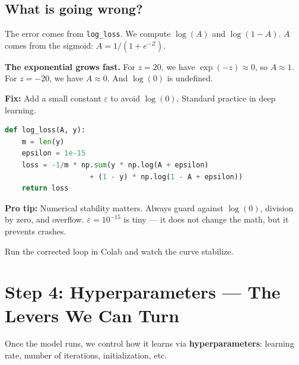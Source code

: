\documentclass[11pt]{article}
\begin{document}
\vspace{0.5em}

\subsection*{What is going wrong?}

The error comes from \texttt{log\_loss}.  
We compute $\log(A)$ and $\log(1-A)$.  
$A$ comes from the sigmoid: $A = 1/(1+e^{-Z})$.

\begin{tcolorbox}[colback=white!98!gray, colframe=gray!30!black, arc=1mm]
\textbf{The exponential grows fast.}  
For $z = 20$, we have $\exp(-z) \approx 0$, so $A \approx 1$.  
For $z = -20$, we have $A \approx 0$.  
And $\log(0)$ is undefined.
\end{tcolorbox}

\vspace{0.5em}

\noindent\textbf{Fix:} Add a small constant $\varepsilon$ to avoid $\log(0)$.  
Standard practice in deep learning.

\begin{lstlisting}[language=Python]
def log_loss(A, y):
    m = len(y)
    epsilon = 1e-15
    loss = -1/m * np.sum(y * np.log(A + epsilon) 
                    + (1 - y) * np.log(1 - A + epsilon))
    return loss
\end{lstlisting}

\begin{tcolorbox}[colback=white!97!gray, colframe=black!20, arc=1mm]
\textbf{Pro tip:} Numerical stability matters.  
Always guard against $\log(0)$, division by zero, and overflow.  
$\varepsilon = 10^{-15}$ is tiny — it does not change the math, but it prevents crashes.
\end{tcolorbox}

\vspace{0.5em}

\noindent Run the corrected loop in Colab and watch the curve stabilize.

\vspace{1em}

\section*{Step 4: Hyperparameters — The Levers We Can Turn}

\begin{tcolorbox}[colback=gray!3, colframe=black!40, title=Step 4: Tune the Learning Process, fonttitle=\bfseries, arc=2mm]
Once the model runs, we control how it learns via \textbf{hyperparameters}:  
learning rate, number of iterations, initialization, etc.
\end{tcolorbox}
\end{document}
